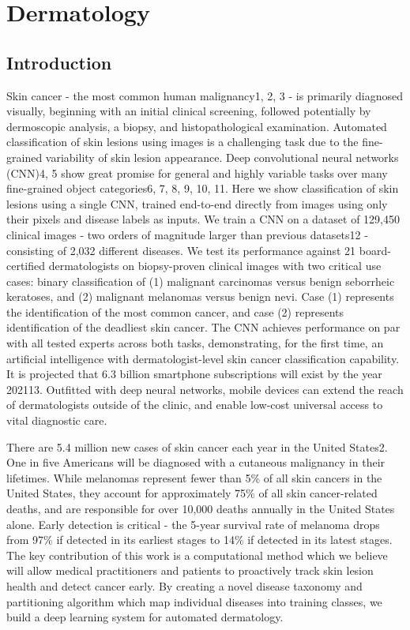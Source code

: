 \chapter{Dermatology}

\section{Introduction}
Skin cancer - the most common human malignancy1, 2, 3 - is primarily diagnosed visually, beginning with an initial clinical screening, followed potentially by dermoscopic analysis, a biopsy, and histopathological examination. Automated classification of skin lesions using images is a challenging task due to the fine-grained variability of skin lesion appearance. Deep convolutional neural networks (CNN)4, 5 show great promise for general and highly variable tasks over many fine-grained object categories6, 7, 8, 9, 10, 11. Here we show classification of skin lesions using a single CNN, trained end-to-end directly from images using only their pixels and disease labels as inputs. We train a CNN on a dataset of 129,450 clinical images - two orders of magnitude larger than previous datasets12 - consisting of 2,032 different diseases. We test its performance against 21 board-certified dermatologists on biopsy-proven clinical images with two critical use cases: binary classification of (1) malignant carcinomas versus benign seborrheic keratoses, and (2) malignant melanomas versus benign nevi. Case (1) represents the identification of the most common cancer, and case (2) represents identification of the deadliest skin cancer. The CNN achieves performance on par with all tested experts across both tasks, demonstrating, for the first time, an artificial intelligence with dermatologist-level skin cancer classification capability. It is projected that 6.3 billion smartphone subscriptions will exist by the year 202113. Outfitted with deep neural networks, mobile devices can extend the reach of dermatologists outside of the clinic, and enable low-cost universal access to vital diagnostic care. 

There are 5.4 million new cases of skin cancer each year in the United States2. One in five Americans will be diagnosed with a cutaneous malignancy in their lifetimes. While melanomas represent fewer than 5\% of all skin cancers in the United States, they account for approximately 75\% of all skin cancer-related deaths, and are responsible for over 10,000 deaths annually in the United States alone. Early detection is critical - the 5-year survival rate of melanoma drops from 97\% if detected in its earliest stages to 14\% if detected in its latest stages. The key contribution of this work is a computational method which we believe will allow medical practitioners and patients to proactively track skin lesion health and detect cancer early. By creating a novel disease taxonomy and partitioning algorithm which map individual diseases into training classes, we build a deep learning system for automated dermatology. 

